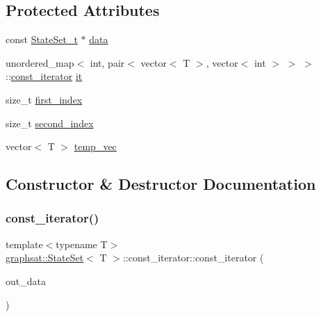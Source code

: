\subsection*{Protected Attributes}
\begin{DoxyCompactItemize}
\item 
const \mbox{\hyperlink{classgraphsat_1_1_state_set_a6474a59203fade7146aacfd0e277ecf4}{State\+Set\+\_\+t}} $\ast$ \mbox{\hyperlink{classgraphsat_1_1_state_set_1_1const__iterator_aa3f0e00b95346e8b87fa80b89f22d7e3}{data}}
\item 
unordered\+\_\+map$<$ int, pair$<$ vector$<$ T $>$, vector$<$ int $>$ $>$ $>$\+::\mbox{\hyperlink{classgraphsat_1_1_state_set_1_1const__iterator}{const\+\_\+iterator}} \mbox{\hyperlink{classgraphsat_1_1_state_set_1_1const__iterator_a60ff6f8b830f8b5107a4e910bbb037db}{it}}
\item 
size\+\_\+t \mbox{\hyperlink{classgraphsat_1_1_state_set_1_1const__iterator_ab001a4dd8835b77d975ae3b41823a8d5}{first\+\_\+index}}
\item 
size\+\_\+t \mbox{\hyperlink{classgraphsat_1_1_state_set_1_1const__iterator_a0b9a877e6673054bc949822a8951ff96}{second\+\_\+index}}
\item 
vector$<$ T $>$ \mbox{\hyperlink{classgraphsat_1_1_state_set_1_1const__iterator_a49d0563da9848398899e23bccae08824}{temp\+\_\+vec}}
\end{DoxyCompactItemize}


\subsection{Constructor \& Destructor Documentation}
\mbox{\label{classgraphsat_1_1_state_set_1_1const__iterator_a0ef15f55d1a11cebb203d15a1f743460}} 
\subsubsection{\texorpdfstring{const\_iterator()}{const\_iterator()}\hspace{0.1cm}{\footnotesize\ttfamily [1/3]}}
{\footnotesize\ttfamily template$<$typename T$>$ \\
\mbox{\hyperlink{classgraphsat_1_1_state_set}{graphsat\+::\+State\+Set}}$<$ T $>$\+::const\+\_\+iterator\+::const\+\_\+iterator (\begin{DoxyParamCaption}\item[{const \mbox{\hyperlink{classgraphsat_1_1_state_set_a6474a59203fade7146aacfd0e277ecf4}{State\+Set\+\_\+t}} $\ast$}]{out\+\_\+data }\end{DoxyParamCaption})\hspace{0.3cm}{\ttfamily [inline]}}

